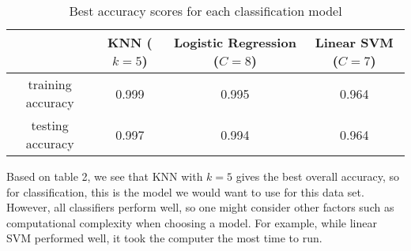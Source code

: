 \documentclass[12pt,letterpaper]{article}
\begin{document}
\begin{table}[h]
	\centering
	\begin{tabular}{ c|ccc } 
		\hline
		&KNN  ($ k=5 $) & Logistic Regression ($ C= 8$)& Linear SVM ($ C= 7$)\\ \hline
		training accuracy & 0.999 & 0.995 & 0.964 \\ 
		testing accuracy & 0.997 & 0.994 & 0.964 \\ 
		\hline
	\end{tabular}
	\caption{ Best accuracy scores for each classification model}
	\label{table: 2}
\end{table}

Based on table 2, we see that KNN with $k=5$ gives the best overall accuracy, so for classification, this is the model we would want to use for this data set. However, all classifiers perform well, so one might consider other factors such as computational complexity when choosing a model. For example, while linear SVM performed well, it took the computer the most time to run. 
\end{document}
